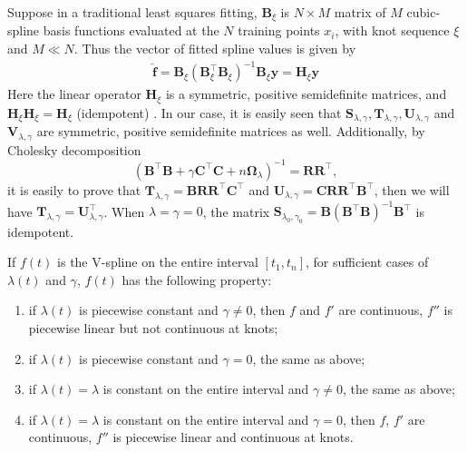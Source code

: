Suppose in a traditional least squares fitting, $\mathbf{B}_\xi$ is $N \times M$ matrix of $M$ cubic-spline basis functions evaluated at the $N$ training points $x_i$, with knot sequence $\xi$ and $M \ll N$. Thus the vector of fitted spline values is given by
\begin{align}\label{fhy}
\hat{\mathbf{f}}=\mathbf{B}_\xi\left(\mathbf{B}^\top_\xi\mathbf{B}_\xi\right)^{-1}\mathbf{B}_\xi\mathbf{y}=\mathbf{H}_\xi\mathbf{y}
\end{align}
Here the linear operator $\mathbf{H}_\xi$ is a symmetric, positive semidefinite matrices, and $\mathbf{H}_\xi\mathbf{H}_\xi=\mathbf{H}_\xi$ (idempotent) \citep{esl2009}. In our case, it is easily seen that $\mathbf{S}_{\lambda,\gamma}, \mathbf{T}_{\lambda,\gamma}, \mathbf{U}_{\lambda,\gamma}$ and $\mathbf{V}_{\lambda,\gamma}$ are symmetric, positive semidefinite matrices as well. Additionally, by Cholesky decomposition
\begin{equation}
\left(\mathbf{B}^\top\mathbf{B}+\gamma\mathbf{C}^\top\mathbf{C}+n\mathbf{\Omega}_{\lambda}\right)^{-1}=\mathbf{R}\mathbf{R}^\top,
\end{equation}
it is easily to prove that $\mathbf{T}_{\lambda,\gamma}=\mathbf{B}\mathbf{R}\mathbf{R}^\top\mathbf{C}^\top$ and $\mathbf{U}_{\lambda,\gamma}=\mathbf{C}\mathbf{R}\mathbf{R}^\top\mathbf{B}^\top$, then we will have 
 $\mathbf{T}_{\lambda,\gamma}= \mathbf{U}_{\lambda,\gamma}^\top$. When $\lambda=\gamma=0$, the matrix $\mathbf{S}_{\lambda_0,\gamma_0}=\mathbf{B}\left(\mathbf{B}^\top\mathbf{B}\right)^{-1}\mathbf{B}^\top$ is idempotent.  


\begin{corollary}\label{TractorsplineCorollary}
If $f(t)$ is the V-spline on the entire interval $[t_1,t_n]$, for sufficient cases of $\lambda(t)$ and $\gamma$, $f(t)$ has the following property:
\begin{enumerate}\itemsep0em 
\item if $\lambda(t)$ is piecewise constant and $\gamma \neq 0$, then $f$ and $f'$ are continuous, $f''$ is piecewise linear but not continuous at knots;
\item if $\lambda(t)$ is piecewise constant and $\gamma = 0$, the same as above;
\item if $\lambda(t)=\lambda $ is constant on the entire interval and $\gamma \neq 0$, the same as above;
\item if $\lambda(t)=\lambda $ is constant on the entire interval and $\gamma = 0$, then $f$, $f'$ are continuous, $f''$ is piecewise linear and continuous at knots.
\end{enumerate}
\end{corollary}

